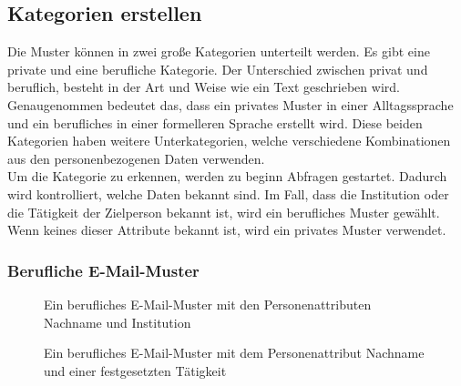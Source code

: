 	\subsection{Kategorien erstellen}
	Die Muster können in zwei große Kategorien unterteilt werden. Es gibt eine private und eine berufliche Kategorie. Der Unterschied zwischen privat und beruflich, besteht in der Art und Weise wie ein Text geschrieben wird. Genaugenommen bedeutet das, dass ein privates Muster in einer Alltagssprache und ein berufliches in einer formelleren Sprache erstellt wird. Diese beiden Kategorien haben weitere Unterkategorien, welche verschiedene Kombinationen aus den personenbezogenen Daten verwenden.\\
	Um die Kategorie zu erkennen, werden zu beginn Abfragen gestartet. Dadurch wird kontrolliert, welche Daten bekannt sind. Im Fall, dass die Institution oder die Tätigkeit der Zielperson bekannt ist, wird ein berufliches Muster gewählt. Wenn keines dieser Attribute bekannt ist, wird ein privates Muster verwendet.
	
		\subsubsection{Berufliche E-Mail-Muster}
		
			\begin{figure}[h!]
				\caption{Ein berufliches E-Mail-Muster mit den Personenattributen Nachname und Institution }
			\end{figure}
		
			\begin{figure}[h!]
				\caption{Ein berufliches E-Mail-Muster mit dem Personenattribut Nachname und einer festgesetzten Tätigkeit}
			\end{figure}
		
